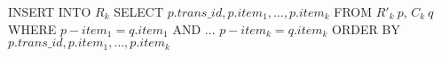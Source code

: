 INSERT INTO $R_k$
SELECT $p.trans\_id, p.item_1, \ldots, p.item_k$
FROM $R'_k\ p$, $C_k\ q$
WHERE $p-item_1 = q.item_1$ AND
      $\ldots$
      $p-item_k = q.item_k$
ORDER BY $p.trans\_id, p.item_1, \ldots, p.item_k$